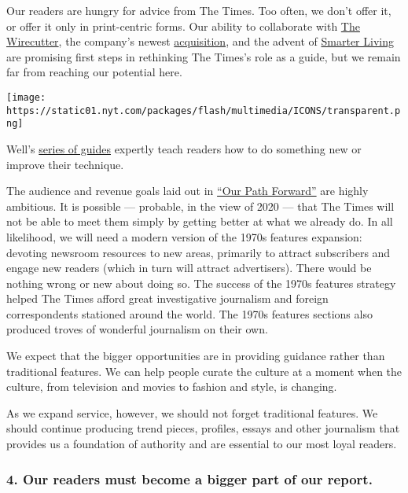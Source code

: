 Our readers are hungry for advice from The Times. Too often, we don't
offer it, or offer it only in print-centric forms. Our ability to
collaborate with \href{http://thewirecutter.com/}{The Wirecutter}, the
company's newest
\href{http://investors.nytco.com/press/press-releases/press-release-details/2016/The-New-York-Times-Company-Acquires-The-Wirecutter-and-The-Sweethome/default.aspx}{acquisition},
and the advent of
\href{https://www.nytimes.com/spotlight/times-tips}{Smarter Living} are
promising first steps in rethinking The Times's role as a guide, but we
remain far from reaching our potential here.

\texttt{[image: https://static01.nyt.com/packages/flash/multimedia/ICONS/transparent.png]}

Well's \href{https://www.nytimes.com/spotlight/well-guides}{series of
guides} expertly teach readers how to do something new or improve their
technique.

The audience and revenue goals laid out in
\href{http://www.nytco.com/wp-content/uploads/Our-Path-Forward.pdf}{``Our
Path Forward''} are highly ambitious. It is possible --- probable, in
the view of 2020 --- that The Times will not be able to meet them simply
by getting better at what we already do. In all likelihood, we will need
a modern version of the 1970s features expansion: devoting newsroom
resources to new areas, primarily to attract subscribers and engage new
readers (which in turn will attract advertisers). There would be nothing
wrong or new about doing so. The success of the 1970s features strategy
helped The Times afford great investigative journalism and foreign
correspondents stationed around the world. The 1970s features sections
also produced troves of wonderful journalism on their own.

We expect that the bigger opportunities are in providing guidance rather
than traditional features. We can help people curate the culture at a
moment when the culture, from television and movies to fashion and
style, is changing.

As we expand service, however, we should not forget traditional
features. We should continue producing trend pieces, profiles, essays
and other journalism that provides us a foundation of authority and are
essential to our most loyal readers.

\hypertarget{4-our-readers-must-become-a-bigger-part-of-our-report}{%
\subsubsection{4. Our readers must become a bigger part of our
report.}\label{4-our-readers-must-become-a-bigger-part-of-our-report}}

